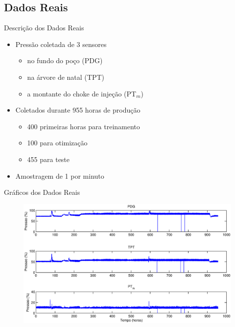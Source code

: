 \documentclass{beamer}
\begin{document}
\subsection{Dados Reais}

\begin{frame}{Descrição dos Dados Reais}
    
    \begin{itemize}
        \item Pressão coletada de 3 sensores
            \begin{itemize}
                \item no fundo do poço (PDG)
                \item na árvore de natal (TPT)
                \item a montante do choke de injeção (PT$_m$)
            \end{itemize}
        \item Coletados durante 955 horas de produção
            \begin{itemize}
                \item 400 primeiras horas para treinamento
                \item 100 para otimização
                \item 455 para teste
            \end{itemize}
        \item Amostragem de 1 por minuto
    \end{itemize}
\end{frame}

\begin{frame}{Gráficos dos Dados Reais}

\begin{figure}[bt]
    \centering
    \includegraphics[trim=2cm .7cm 2cm .7cm,clip=true,width=\textwidth]{figuras/real_dataset.eps}
\end{figure}

    
\end{frame}
\end{document}
